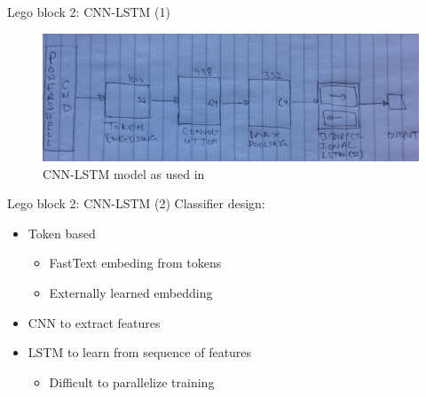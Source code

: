 \documentclass[10pt]{beamer}
\begin{document}
\begin{frame}{Lego block 2: CNN-LSTM (1)}
	\begin{figure}
		\includegraphics[scale=0.50]{cnn-lstm}
		\caption{CNN-LSTM model as used in \cite{amsi2019}}
	\end{figure}
\end{frame}

\begin{frame}{Lego block 2: CNN-LSTM (2)}
	Classifier design:
	\begin{itemize}
		\item Token based
		\begin{itemize}
			\item FastText embeding from tokens
			\item Externally learned embedding
		\end{itemize}
		\item CNN to extract features
		\item LSTM to learn from sequence of features
		\begin{itemize}
			\item Difficult to parallelize training
		\end{itemize}
	\end{itemize}
\end{frame}
\end{document}
